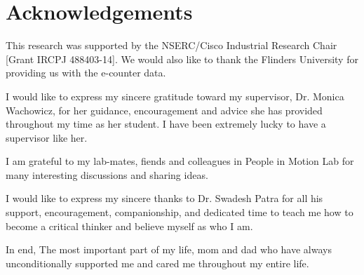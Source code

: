 \chapter*{Acknowledgements}

This research was supported by the NSERC/Cisco Industrial Research Chair [Grant IRCPJ 488403-14]. We would also like to thank the Flinders University for providing us with the e-counter data.

I would like to express my sincere gratitude toward my supervisor, Dr. Monica Wachowicz, for her guidance, encouragement and advice she has provided throughout my time as her student. I have been extremely lucky to have a supervisor like her.


I am  grateful to my lab-mates, fiends and colleagues in People in Motion Lab for many interesting discussions and sharing ideas. 

I would like to express my sincere thanks to Dr. Swadesh Patra for all his support, encouragement, companionship, and dedicated time to teach me how to become a critical thinker and believe myself as who I am.  

In end, The most important part of my life, mom and dad who have always unconditionally supported me and cared me throughout my entire life. 